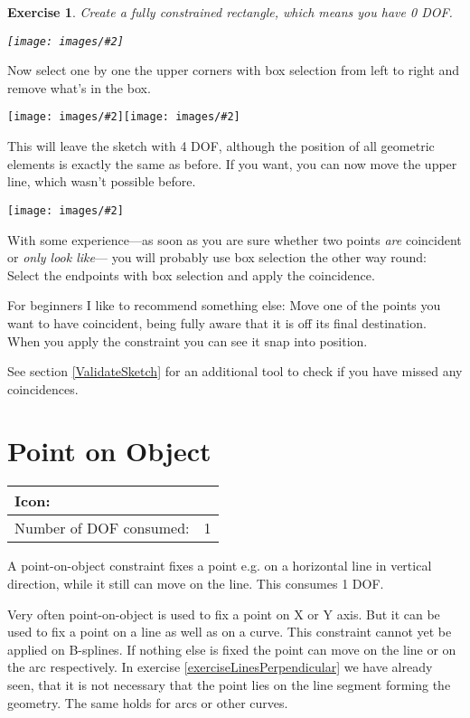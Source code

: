 \documentclass[12pt,titlepage]{article}
\newcommand{\icon}[1]{\raisebox{-1em}{\rule{0pt}{27pt}\texttt{[image: images/\#1]}}}
\newcommand{\img}[2]{\vspace{2ex}\noindent\texttt{[image: images/\#2]}}
\newcommand{\dofConsumed}{Number of DOF consumed:}
\newtheorem{Exercise}{Exercise}
\begin{document}
\begin{Exercise} \label{ExampleBoxSelection} Create a fully constrained rectangle, which means you have 0 DOF.
	
	\img{}{Coincidence1} \end{Exercise} Now select one by one the upper corners with box selection from left to right and remove what's in the box.

\img{scale=0.9}{Coincidence2}\hspace{2em}\img{scale=0.9}{Coincidence3}

This will leave the sketch with 4 DOF, although the position of all geometric elements is exactly the same as before. If you want, you can now move the upper line, which wasn't possible before.

\img{scale=0.7}{Coincidence4}

With some experience---as soon as you are sure whether two points \emph{are} coincident or \emph{only look like}--- you will probably use box selection the other way round: Select the endpoints with box selection and apply the coincidence.

For beginners I like to recommend something else: Move one of the points you want to have coincident, being fully aware that it is off its final destination. When you apply the constraint you can see it snap into position.

See section \vref{ValidateSketch} for an additional tool to check if you have missed any coincidences.


\section{Point on Object} \label{PointOnObject} \begin{tabular}{|l|l|} \hline Icon: & \icon{Constraint_PointOnObject}\\ \hline \dofConsumed & 1 \\ \hline \end{tabular}

A point-on-object constraint fixes a point e.g. on a horizontal line in vertical direction, while it still can move on the line. This consumes 1 DOF.


 Very often point-on-object is used to fix a point on X or Y axis. But it can be used to fix a point on a line as well as on a curve. This constraint cannot yet be applied on B-splines. If nothing else is fixed the point can move on the line or on the arc respectively. In exercise \vref{exerciseLinesPerpendicular} we have already seen, that it is not necessary that the point lies on the line segment forming the geometry. The same holds for arcs or other curves.
\end{document}
